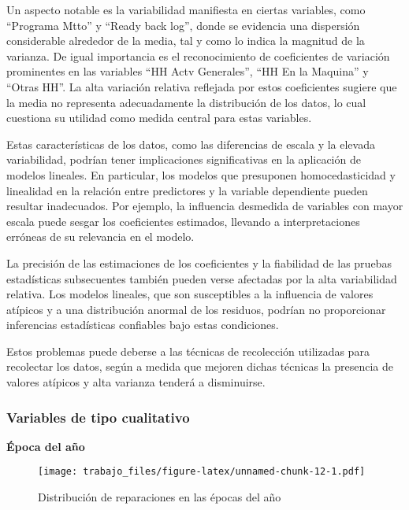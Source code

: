 \documentclass[
  11pt,
  bookmarksnumbered]{article}
\begin{document}
Un aspecto notable es la variabilidad manifiesta en ciertas variables, como ``Programa Mtto'' y ``Ready back log'', donde se evidencia una dispersión considerable alrededor de la media, tal y como lo indica la magnitud de la varianza.
De igual importancia es el reconocimiento de coeficientes de variación prominentes en las variables ``HH Actv Generales'', ``HH En la Maquina'' y ``Otras HH''.
La alta variación relativa reflejada por estos coeficientes sugiere que la media no representa adecuadamente la distribución de los datos, lo cual cuestiona su utilidad como medida central para estas variables.

Estas características de los datos, como las diferencias de escala y la elevada variabilidad, podrían tener implicaciones significativas en la aplicación de modelos lineales.
En particular, los modelos que presuponen homocedasticidad y linealidad en la relación entre predictores y la variable dependiente pueden resultar inadecuados.
Por ejemplo, la influencia desmedida de variables con mayor escala puede sesgar los coeficientes estimados, llevando a interpretaciones erróneas de su relevancia en el modelo.

La precisión de las estimaciones de los coeficientes y la fiabilidad de las pruebas estadísticas subsecuentes también pueden verse afectadas por la alta variabilidad relativa.
Los modelos lineales, que son susceptibles a la influencia de valores atípicos y a una distribución anormal de los residuos, podrían no proporcionar inferencias estadísticas confiables bajo estas condiciones.

Estos problemas puede deberse a las técnicas de recolección utilizadas para recolectar los datos, según \textcite{gujarati2009basic} a medida que mejoren dichas técnicas la presencia de valores atípicos y alta varianza tenderá a disminuirse.

\hypertarget{variables-de-tipo-cualitativo}{%
\subsubsection{Variables de tipo cualitativo}\label{variables-de-tipo-cualitativo}}

\textbf{Época del año}

\begin{figure}
\centering
\texttt{[image: trabajo\_files/figure-latex/unnamed-chunk-12-1.pdf]}
\caption{\label{fig:unnamed-chunk-12}Distribución de reparaciones en las épocas del año}
\end{figure}
\end{document}
